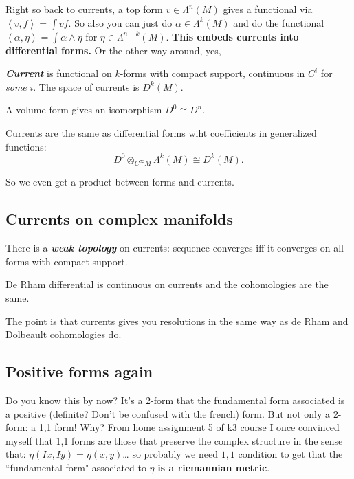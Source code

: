 Right so back to currents, a top form \(v \in \Lambda^{n}(M)\) gives a functional via \(\left<v,f\right>=\int vf\). So also you can just do \(\alpha \in \Lambda^{k}(M)\) and do the functional \(\left<\alpha,\eta\right>=\int \alpha \wedge \eta\) for \(\eta \in \Lambda^{ n-k}(M)\). \textbf{This embeds currents into differential forms.} Or the other way around, yes,

\begin{defn}\leavevmode
\textit{\textbf{Current}} is functional on \(k\)-forms with compact support, continuous in \(C^i\) for \textit{some} \(i\). The space of currents is \(D^k(M)\). 
\end{defn}

\begin{remark}\leavevmode
A volume form gives an isomorphism \(D^0 \cong D^n\).
\end{remark}

\begin{upshot}\leavevmode
Currents are the same as differential forms wiht coefficients in generalized functions:
\[D^0 \otimes_{C^\infty M}\Lambda^{k}(M) \cong D^k(M).\]
\end{upshot}

So we even get a product between forms and currents.

\subsection{Currents on complex manifolds}

\begin{defn}\leavevmode
There is a \textit{\textbf{weak topology}} on currents: sequence converges iff it converges on all forms with compact support.
\end{defn}

\begin{claim}\leavevmode
De Rham differential is continuous on currents and the cohomologies are the same.
\end{claim}

The point is that currents gives you resolutions in the same way as de Rham and Dolbeault cohomologies do.

\subsection{Positive forms again}

Do you know this by now? It's a 2-form that the fundamental form associated is a positive (definite? Don't be confused with the french) form. But not only a 2-form: a 1,1 form! Why? From home assignment 5 of k3 course I once convinced myself that 1,1 forms are those that preserve the complex structure in the sense that: \(\eta(Ix,Iy)=\eta(x,y)\)… so probably we need \(1,1\) condition to get that the ``fundamental form" associated to \(\eta\) \textbf{is a riemannian metric}.

